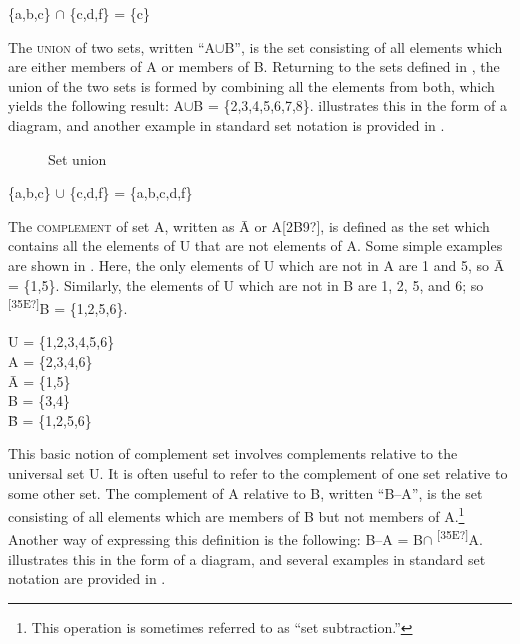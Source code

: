 \begin{stylepoints}
\{a,b,c\} ${\cap}$ \{c,d,f\} = \{c\}
\end{stylepoints}


The \textsc{union} of two sets, written “A${\cup}$B”, is the set consisting of all elements which are either members of A or members of B. Returning to the sets defined in , the union of the two sets is formed by combining all the elements from both, which yields the following result: A${\cup}$B = \{2,3,4,5,6,7,8\}.  illustrates this in the form of a diagram, and another example in standard set notation is provided in .


\begin{figure}

\caption{\label{fig:key:3}Set union}
\end{figure}

\begin{stylepoints}
\{a,b,c\} ${\cup}$ \{c,d,f\} = \{a,b,c,d,f\}
\end{stylepoints}


The \textsc{complement} of set A, written as \=A or A[2B9?], is defined as the set which contains all the elements of U that are not elements of A. Some simple examples are shown in . Here, the only elements of U which are not in A are 1 and 5, so \=A = \{1,5\}. Similarly, the elements of U which are not in B are 1, 2, 5, and 6; so \textsuperscript{ [35E?]}B = \{1,2,5,6\}.


\ea
U = \{1,2,3,4,5,6\}\\
A = \{2,3,4,6\}\\
\=A = \{1,5\}\\
B = \{3,4\}\\
\=B = \{1,2,5,6\}
\z


This basic notion of complement set involves complements relative to the universal set U. It is often useful to refer to the complement of one set relative to some other set. The complement of A relative to B, written “B–A”, is the set consisting of all elements which are members of B but not members of A.\footnote{This operation is sometimes referred to as “set subtraction.”} Another way of expressing this definition is the following: B–A = B${\cap}$\textsuperscript{ [35E?]}A.  illustrates this in the form of a diagram, and several examples in standard set notation are provided in .

